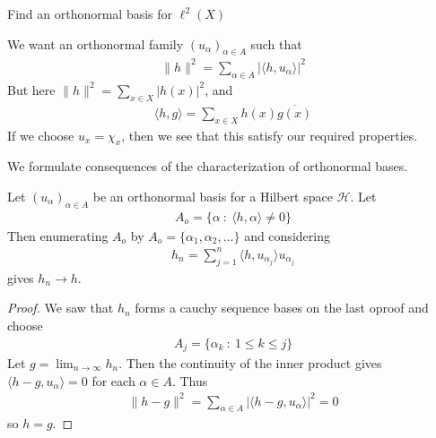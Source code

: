 

\begin{exercise}
  Find an orthonormal basis for $\ell^{2}(X)$
\end{exercise}
\begin{solution}
  We want an orthonormal family $(u_\alpha)_{\alpha \in A}$ such that
  \begin{align*}
    \|h\|^2 = \sum_{\alpha \in  A} |\langle h , u_\alpha \rangle |^2
  \end{align*}
  But here $\|h\|^2 = \sum_{x \in X} |h(x)|^{2}$, and
  \begin{align*}
    \langle h , g \rangle = \sum_{x \in X} h(x) \overline{g(x)}
  \end{align*}
  If we choose $u_x = \chi_{x}$, then we see that this satisfy our
  required properties.
\end{solution}

We formulate consequences of the characterization of orthonormal bases.

\begin{theorem}
  Let $(u_\alpha)_{\alpha \in A}$ be an orthonormal basis for a
  Hilbert space $\mathcal{H}$. Let
  \begin{align*}
    A_o = \{ \alpha  \ : \   \langle h , \alpha \rangle \neq 0 \}
  \end{align*}
  Then enumerating  $A_o$ by $A_o = \{  \alpha_1 ,  \alpha_2 , \ldots
  \}$ and considering
  \begin{align*}
    h_n = \sum_{j = 1}^{n} \langle h , u_{\alpha_j} \rangle  u_{\alpha_j}
  \end{align*}
  gives $h_n \to h$.
\end{theorem}
\begin{proof}
  We saw that $h_n$ forms a cauchy sequence bases on the last oproof and choose
  \begin{align*}
    A_j = \{ \alpha_k  \ : \  1 \le k \le j \}
  \end{align*}
  Let $g = \lim_{n \to \infty} h_n$. Then the continuity of the inner
  product gives $ \langle h-g , u_\alpha \rangle = 0$ for each $\alpha \in A$.
  Thus
  \begin{align*}
    \|h - g\|^2 = \sum_{\alpha \in  A} |\langle h-g , u_\alpha \rangle |^2 = 0
  \end{align*}
  so $h = g$.
\end{proof}

